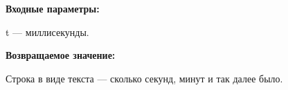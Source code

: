 \textbf{Входные параметры:}

t --- миллисекунды.

\textbf{Возвращаемое значение:}

Строка в виде текста --- сколько секунд, минут и так далее было.